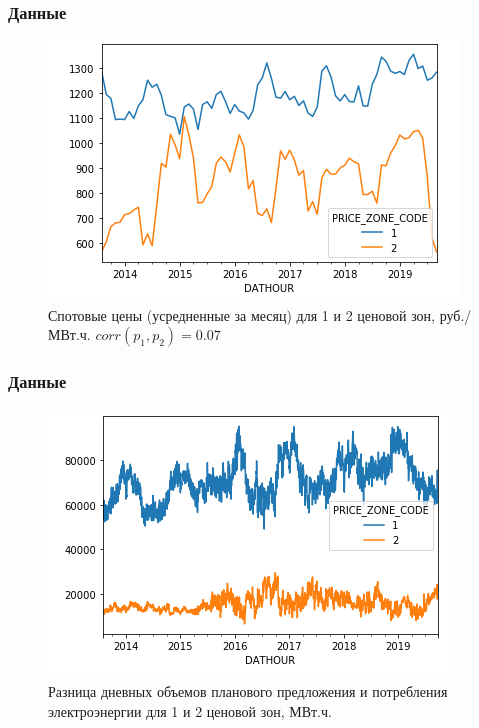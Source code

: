 \documentclass[c, dvipsnames]{beamer}  %
\begin{document}
\begin{frame}[shrink=5]
\frametitle{Данные} 

\begin{figure}
\centering
\includegraphics[width=0.7\linewidth]{screenshot010}
\caption{Спотовые цены (усредненные за месяц) для 1 и 2 ценовой зон, руб./МВт.ч. $corr(p_1,p_2)  =  0.07  $}
\label{fig:screenshot009}
\end{figure}




\end{frame}




\begin{frame}[shrink=5]
\frametitle{Данные} 

\begin{figure}
	\centering
	\includegraphics[width=0.7\linewidth]{screenshot011}
	\caption{Разница дневных объемов планового предложения и потребления электроэнергии для 1 и 2 ценовой зон, МВт.ч.}
	\label{fig:screenshot011}
\end{figure}




\end{frame}
\end{document}
